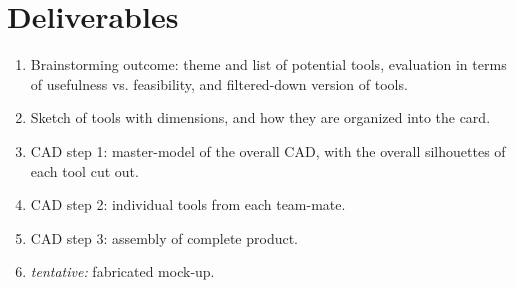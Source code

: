 \documentclass[11pt]{article}
\begin{document}
\section{Deliverables}

\begin{enumerate}
    \item Brainstorming outcome: theme and list of potential tools, evaluation in terms of usefulness vs. feasibility, and filtered-down version of tools.
    \item Sketch of tools with dimensions, and how they are organized into the card.
    \item CAD step 1: master-model of the overall CAD, with the overall silhouettes of each tool cut out.
    \item CAD step 2: individual tools from each team-mate.
    \item CAD step 3: assembly of complete product.
    \item \emph{tentative:} fabricated mock-up.
\end{enumerate}

\end{document}
